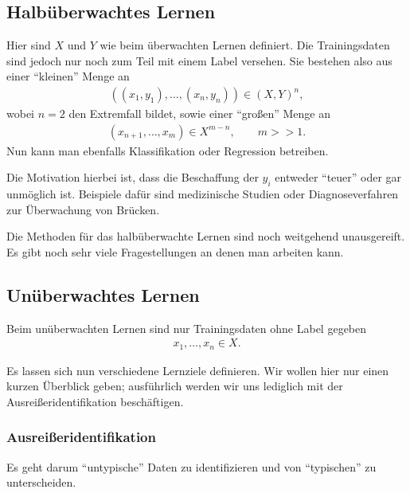 \subsection{Halbüberwachtes Lernen}

Hier sind $X$ und $Y$ wie beim überwachten Lernen definiert. Die Trainingsdaten
sind jedoch nur noch zum Teil mit einem Label versehen. Sie bestehen also aus
einer "`kleinen"' Menge an
\begin{align*}
((x_1,y_1),\ldots,(x_n,y_n))\in (X,Y)^n,
\end{align*}
wobei $n=2$ den Extremfall bildet, sowie einer "`großen"' Menge an
\begin{align*}
(x_{n+1},\ldots,x_m)\in X^{m-n},\qquad m>> 1.
\end{align*}
Nun kann man ebenfalls Klassifikation oder Regression betreiben.

Die Motivation hierbei ist, dass die Beschaffung der $y_i$ entweder ``teuer''
oder gar unmöglich ist. Beispiele dafür sind medizinische Studien oder
Diagnoseverfahren zur Überwachung von Brücken.

Die Methoden für das halbüberwachte Lernen sind noch weitgehend unausgereift.
Es gibt noch sehr viele Fragestellungen an denen man arbeiten kann.

\subsection{Unüberwachtes Lernen}

Beim unüberwachten Lernen sind nur Trainingsdaten ohne Label gegeben
\begin{align*}
x_1,\ldots,x_n\in X.
\end{align*}

Es lassen sich nun verschiedene Lernziele definieren. Wir wollen hier nur einen
kurzen Überblick geben; ausführlich werden wir uns lediglich mit der
Ausreißeridentifikation beschäftigen.

\subsubsection{Ausreißeridentifikation}

Es geht darum ``untypische'' Daten zu identifizieren und von "`typischen"' zu
unterscheiden.

